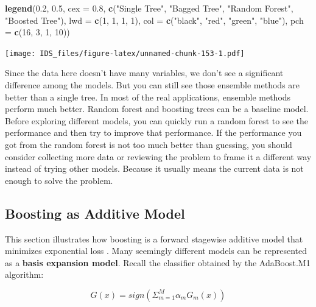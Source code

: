 \documentclass[12pt,]{krantz}
\makeatletter
\newenvironment{Shaded}{\begin{snugshade}}{\end{snugshade}}
\newcommand{\DataTypeTok}[1]{\textcolor[rgb]{0.27,0.27,0.27}{#1}}
\newcommand{\DecValTok}[1]{\textcolor[rgb]{0.06,0.06,0.06}{#1}}
\newcommand{\FloatTok}[1]{\textcolor[rgb]{0.06,0.06,0.06}{#1}}
\newcommand{\KeywordTok}[1]{\textcolor[rgb]{0.27,0.27,0.27}{\textbf{#1}}}
\newcommand{\NormalTok}[1]{#1}
\newcommand{\StringTok}[1]{\textcolor[rgb]{0.5,0.5,0.5}{#1}}
\newenvironment{kframe}{%
\medskip{}
\setlength{\fboxsep}{.8em}
 \def\at@end@of@kframe{}%
 \ifinner\ifhmode%
  \def\at@end@of@kframe{\end{minipage}}%
  \begin{minipage}{\columnwidth}%
 \fi\fi%
 \def\FrameCommand##1{\hskip\@totalleftmargin \hskip-\fboxsep
 \colorbox{shadecolor}{##1}\hskip-\fboxsep
     \hskip-\linewidth \hskip-\@totalleftmargin \hskip\columnwidth}%
 \MakeFramed {\advance\hsize-\width
   \@totalleftmargin\z@ \linewidth\hsize
   \@setminipage}}%
 {\par\unskip\endMakeFramed%
 \at@end@of@kframe}
\renewenvironment{Shaded}{\begin{kframe}}{\end{kframe}}
\makeatother
\begin{document}
\begin{Shaded}
\begin{Highlighting}[]
\KeywordTok{legend}\NormalTok{(}\FloatTok{0.2}\NormalTok{, }\FloatTok{0.5}\NormalTok{, }\DataTypeTok{cex =} \FloatTok{0.8}\NormalTok{,}
       \KeywordTok{c}\NormalTok{(}\StringTok{"Single Tree"}\NormalTok{, }\StringTok{"Bagged Tree"}\NormalTok{, }\StringTok{"Random Forest"}\NormalTok{, }\StringTok{"Boosted Tree"}\NormalTok{),}
       \DataTypeTok{lwd =} \KeywordTok{c}\NormalTok{(}\DecValTok{1}\NormalTok{, }\DecValTok{1}\NormalTok{, }\DecValTok{1}\NormalTok{, }\DecValTok{1}\NormalTok{),}
       \DataTypeTok{col =} \KeywordTok{c}\NormalTok{(}\StringTok{"black"}\NormalTok{, }\StringTok{"red"}\NormalTok{, }\StringTok{"green"}\NormalTok{, }\StringTok{"blue"}\NormalTok{),}
       \DataTypeTok{pch =} \KeywordTok{c}\NormalTok{(}\DecValTok{16}\NormalTok{, }\DecValTok{3}\NormalTok{, }\DecValTok{1}\NormalTok{, }\DecValTok{10}\NormalTok{))}
\end{Highlighting}
\end{Shaded}

\texttt{[image: IDS\_files/figure-latex/unnamed-chunk-153-1.pdf]}

Since the data here doesn't have many variables, we don't see a significant difference among the models. But you can still see those ensemble methods are better than a single tree. In most of the real applications, ensemble methods perform much better. Random forest and boosting trees can be a baseline model. Before exploring different models, you can quickly run a random forest to see the performance and then try to improve that performance. If the performance you got from the random forest is not too much better than guessing, you should consider collecting more data or reviewing the problem to frame it a different way instead of trying other models. Because it usually means the current data is not enough to solve the problem.

\hypertarget{boosting-as-additive-model}{%
\subsection{Boosting as Additive Model}\label{boosting-as-additive-model}}

This section illustrates how boosting is a forward stagewise additive model that minimizes exponential loss \citep{Friedman2000}. Many seemingly different models can be represented as a \textbf{basis expansion model}. Recall the classifier obtained by the AdaBoost.M1 algorithm:

\[G(x)=sign ( \Sigma_{m=1}^M \alpha_{m}G_m(x))\]
\end{document}
